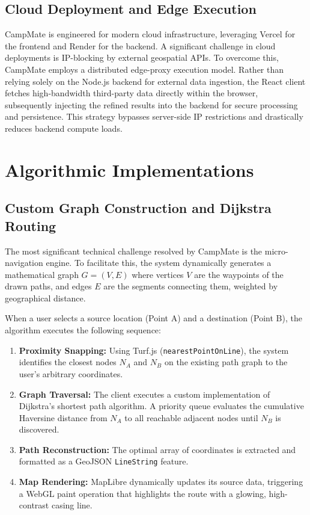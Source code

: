 \documentclass[conference]{IEEEtran}
\begin{document}
\subsection{Cloud Deployment and Edge Execution}
CampMate is engineered for modern cloud infrastructure, leveraging Vercel for the frontend and Render for the backend. A significant challenge in cloud deployments is IP-blocking by external geospatial APIs. To overcome this, CampMate employs a distributed edge-proxy execution model. Rather than relying solely on the Node.js backend for external data ingestion, the React client fetches high-bandwidth third-party data directly within the browser, subsequently injecting the refined results into the backend for secure processing and persistence. This strategy bypasses server-side IP restrictions and drastically reduces backend compute loads.

\section{Algorithmic Implementations}

\subsection{Custom Graph Construction and Dijkstra Routing}
The most significant technical challenge resolved by CampMate is the micro-navigation engine. To facilitate this, the system dynamically generates a mathematical graph \( G = (V, E) \) where vertices \( V \) are the waypoints of the drawn paths, and edges \( E \) are the segments connecting them, weighted by geographical distance.

When a user selects a source location (Point A) and a destination (Point B), the algorithm executes the following sequence:
\begin{enumerate}
    \item \textbf{Proximity Snapping:} Using Turf.js (\texttt{nearestPointOnLine}), the system identifies the closest nodes \( N_A \) and \( N_B \) on the existing path graph to the user's arbitrary coordinates.
    \item \textbf{Graph Traversal:} The client executes a custom implementation of Dijkstra's shortest path algorithm. A priority queue evaluates the cumulative Haversine distance from \( N_A \) to all reachable adjacent nodes until \( N_B \) is discovered.
    \item \textbf{Path Reconstruction:} The optimal array of coordinates is extracted and formatted as a GeoJSON \texttt{LineString} feature.
    \item \textbf{Map Rendering:} MapLibre dynamically updates its source data, triggering a WebGL paint operation that highlights the route with a glowing, high-contrast casing line.
\end{enumerate}
\end{document}
